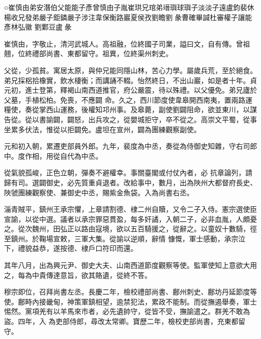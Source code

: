 
\begin{pinyinscope}

 ○崔慎由弟安潛伯父能能子彥曾慎由子胤崔珙兄琯弟瑨璵球璵子淡淡子遠盧鈞裴休楊收兄發弟嚴子鉅鏻嚴子涉注韋保衡路巖夏侯孜劉瞻劉彖曹確畢諴杜審權子讓能彥林弘徽
 劉鄴豆盧彖



 崔慎由，字敬止，清河武城人。高祖融，位終國子司業，謚曰文，自有傳。曾祖翹，位終禮部尚書、東都留守。祖異，位終渠州刺史。



 父從，少孤貧。寓居太原，與仲兄能同隱山林，苦心力學。屬歲兵荒，至於絕食。弟兄採梠拾橡實，飲水棲衡；而講誦不輟。怡然終日，不出山巖，如是者十年。貞元初，進士登第，釋褐山南西道推官，府公嚴震，待以殊禮。以父優免。弟兄廬於父墓，手植松柏。免喪，不應闢
 命。久之，西川節度使韋皋開西南夷，置兩路運糧使，奏從掌西山運務，後權知邛州事。及皋薨，副使劉闢阻命，欲並東川，以謀告從。從以書諭闢，闢怒，出兵攻之，從嬰城拒守，卒不從之。高崇文平蜀，從事坐累多伏法，惟從以拒闢免。盧坦在宣州，闢為團練觀察副使。



 元和初入朝，累遷吏部員外郎。九年，裴度為中丞，奏從為侍御史知雜，守右司郎中。度作相，用從自代為中丞。



 從氣貌孤峻，正色立朝，彈奏不避權幸。事關臺閣或付仗內者，必
 抗章論列，請歸有司。選闢御史，必先質重貞退者。改給事中，數月，出為陜州大都督府長史、陜虢團練觀察使、兼御史中丞，賜紫金魚袋。入為尚書右丞。



 淄青賊平，鎮州王承宗懼，上章請割德、棣二州自贖，又令二子入侍。憲宗選使臣宣諭，以從中選。議者以承宗罪惡貫盈，每多奸譎，入朝二子，必非血胤，人頗憂之。從次魏州，田弘正以路由寇境，欲以五百騎援之，從辭之。以童奴十數騎，徑至鎮州。於鞠場宣敕，三軍大集。從諭以逆順，辭情
 慷慨，軍士感動，承宗泣下，禮貌益恭，遂按德、棣戶口符印而還。



 其年八月，出為興元尹、御史大夫、山南西道節度觀察等使。監軍使知上意欲大用之，每為中貴傳達意旨，欲其賂遺，從終不答。



 穆宗即位，召拜尚書左丞。長慶二年，檢校禮部尚書、鄜州刺史、鄜坊丹延節度等使。鄜畤內接畿甸，神策軍鎮相望，逾禁犯法，累政不能制。而從撫遏舉奏，軍士惕然。黨項羌有以羊馬來市者，必先遺帥守，從皆不受，撫諭遣之。群羌不敢為盜。四年，入
 為吏部侍郎，尋改太常卿。寶歷二年，檢校吏部尚書，充東都留守。




\end{pinyinscope}
